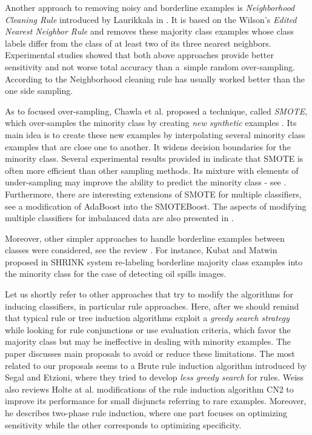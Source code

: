 \documentclass{AIMeth05}
\begin{document}
Another approach to removing noisy and borderline examples is {\em
Neighborhood Cleaning Rule} introduced by Laurikkala  in \cite{Lav}. It is
based on the Wilson's {\em Edited Nearest Neighbor Rule} and removes these
majority class examples whose class labels differ from the class of at least
two of its three nearest neighbors. Experimental studies \cite{Batista,Lav}
showed that both above approaches provide better sensitivity and not worse
total accuracy than a~simple random over-sampling. According to \cite{Lav}
the Neighborhood cleaning rule has usually worked better than the one side
sampling.


As to focused over-sampling, Chawla et al. proposed a technique, called {\em
SMOTE}, which over-samples the minority class by creating {\em new
synthetic} examples \cite{Smote}. Its main idea is to create these new
examples by interpolating several minority class examples that are close one
to another. It widens decision boundaries for the minority class. Several
experimental results provided in \cite{Batista,Smote} indicate that SMOTE is
often more efficient than other sampling methods. Its mixture with elements
of under-sampling may improve the ability to predict the minority class -
see \cite{Batista}. Furthermore, there are interesting extensions of SMOTE
for multiple classifiers, see a modification of AdaBoost into the
SMOTEBoost. The aspects of modifying multiple classifiers for imbalanced
data are also presented in \cite{Gary}.

Moreover, other simpler approaches to handle borderline examples between
classes were considered, see the review \cite{Gary}. For instance, Kubat and
Matwin proposed in SHRINK system re-labeling borderline majority class
examples into the minority class for the case of detecting oil spills
images.

Let us shortly refer to other approaches that try to modify the algorithms
for inducing classifiers, in particular rule approaches. Here, after
\cite{Gary} we should remind that typical rule or tree induction algorithms
exploit a {\em greedy search strategy} while looking for rule conjunctions
or use evaluation criteria, which favor the majority class but may be
ineffective in dealing with minority examples. The paper \cite{Gary}
discusses main proposals to avoid or reduce these limitations. The most
related to our proposals seems to a  Brute rule induction algorithm
introduced by Segal and Etzioni, where they  tried to develop {\em less
greedy search} for rules. Weiss \cite{Gary} also reviews Holte at al.
modifications of the rule induction algorithm CN2 to improve its performance
for small disjuncts referring to rare examples. Moreover, he describes
two-phase rule induction, where one part focuses on optimizing sensitivity
while the other corresponds to optimizing specificity.
\end{document}
